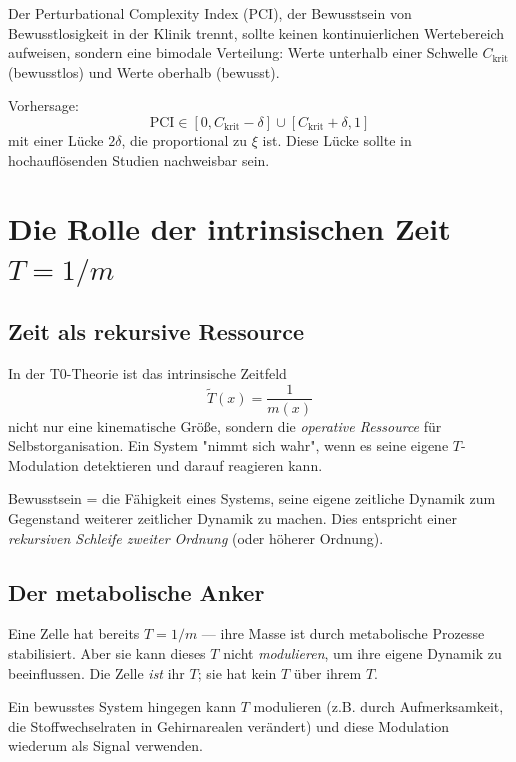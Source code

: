 \documentclass[11pt,a4paper]{article}
\begin{document}
	Der Perturbational Complexity Index (PCI), der Bewusstsein von Bewusstlosigkeit in der Klinik trennt, sollte keinen kontinuierlichen Wertebereich aufweisen, sondern eine bimodale Verteilung: Werte unterhalb einer Schwelle \(C_{\text{krit}}\) (bewusstlos) und Werte oberhalb (bewusst).
	
	Vorhersage: 
	\[
	\text{PCI} \in [0, C_{\text{krit}} - \delta] \cup [C_{\text{krit}} + \delta, 1]
	\]
	mit einer Lücke \(2\delta\), die proportional zu \(\xi\) ist. Diese Lücke sollte in hochauflösenden Studien nachweisbar sein.
	
	\section{Die Rolle der intrinsischen Zeit \(T = 1/m\)}
	\label{sec:zeit}
	
	\subsection{Zeit als rekursive Ressource}
	
	In der T0-Theorie ist das intrinsische Zeitfeld
	\[
	\tilde{T}(x) = \frac{1}{m(x)}
	\]
	nicht nur eine kinematische Größe, sondern die \emph{operative Ressource} für Selbstorganisation. Ein System "nimmt sich wahr", wenn es seine eigene \(T\)-Modulation detektieren und darauf reagieren kann.
	
	\begin{important}
		Bewusstsein = die Fähigkeit eines Systems, seine eigene zeitliche Dynamik zum Gegenstand weiterer zeitlicher Dynamik zu machen. Dies entspricht einer \emph{rekursiven Schleife zweiter Ordnung} (oder höherer Ordnung).
	\end{important}
	
	\subsection{Der metabolische Anker}
	
	Eine Zelle hat bereits \(T = 1/m\) — ihre Masse ist durch metabolische Prozesse stabilisiert. Aber sie kann dieses \(T\) nicht \emph{modulieren}, um ihre eigene Dynamik zu beeinflussen. Die Zelle \emph{ist} ihr \(T\); sie hat kein \(T\) über ihrem \(T\).
	
	Ein bewusstes System hingegen kann \(T\) modulieren (z.B. durch Aufmerksamkeit, die Stoffwechselraten in Gehirnarealen verändert) und diese Modulation wiederum als Signal verwenden.
	
\end{document}
